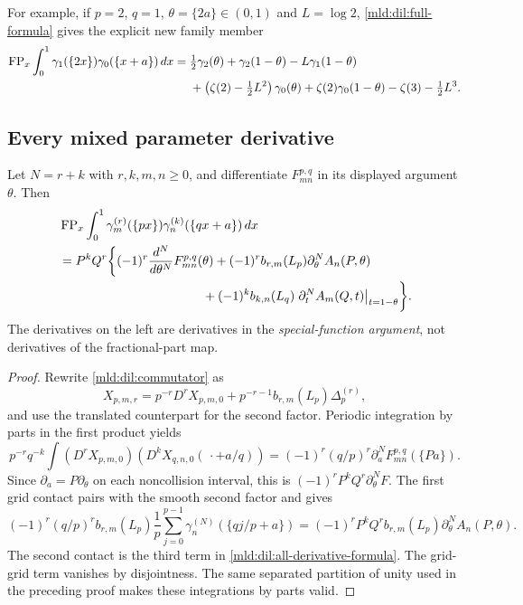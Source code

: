 For example, if $p=2$, $q=1$, $\theta=\{2a\}\in(0,1)$ and
$L=\log2$, \eqref{mld:dil:full-formula} gives the explicit new family member
\begin{align}
 \operatorname{FP}_x\int_0^1\gamma_1(\{2x\})\gamma_0(\{x+a\})\,dx
 ={}&\tfrac12\gamma_2(\theta)+\gamma_2(1-\theta)
        -L\gamma_1(1-\theta)\notag\\
 &+\left(\zeta(2)-\tfrac12L^2\right)\gamma_0(\theta)
        +\zeta(2)\gamma_0(1-\theta)-\zeta(3)-\tfrac12L^3.
 \label{mld:dil:mixed-example}
\end{align}

\subsection{Every mixed parameter derivative}
\begin{theorem}
\label{mld:dil:all-derivatives}
Let $N=r+k$ with $r,k,m,n\ge0$, and differentiate
$F_{mn}^{p,q}$ in its displayed argument $\theta$.  Then
\begin{align}
 &\operatorname{FP}_x\int_0^1
       \gamma_m^{(r)}(\{px\})\gamma_n^{(k)}(\{qx+a\})\,dx\notag\\
 &=P^kQ^r\biggl\{
       (-1)^r\frac{d^N}{d\theta^N}F_{mn}^{p,q}(\theta)
       +(-1)^r b_{r,m}(L_p)\partial_\theta^N A_n(P,\theta)\notag\\
 &\hspace{40mm}
       +(-1)^k b_{k,n}(L_q)
          \left.\partial_t^N A_m(Q,t)\right|_{t=1-\theta}
               \biggr\}.
 \label{mld:dil:all-derivative-formula}
\end{align}
The derivatives on the left are derivatives in the \emph{special-function
argument}, not derivatives of the fractional-part map.
\end{theorem}
\begin{proof}
Rewrite \eqref{mld:dil:commutator} as
\[
 X_{p,m,r}=p^{-r}D^rX_{p,m,0}
          +p^{-r-1}b_{r,m}(L_p)\Delta_p^{(r)},
\]
and use the translated counterpart for the second factor.  Periodic
integration by parts in the first product yields
\[
 p^{-r}q^{-k}\int(D^rX_{p,m,0})(D^kX_{q,n,0}(\,\cdot+a/q))
 =(-1)^r(q/p)^r\partial_a^NF_{mn}^{p,q}(\{Pa\}).
\]
Since $\partial_a=P\partial_\theta$ on each noncollision interval,
this is $(-1)^rP^kQ^r\partial_\theta^NF$.
The first grid contact pairs with the smooth second factor and gives
\[
 (-1)^r(q/p)^r b_{r,m}(L_p)\frac1p
       \sum_{j=0}^{p-1}\gamma_n^{(N)}(\{qj/p+a\})
 =(-1)^rP^kQ^r b_{r,m}(L_p)\partial_\theta^NA_n(P,\theta).
\]
The second contact is the third term in
\eqref{mld:dil:all-derivative-formula}.  The grid-grid term vanishes by
disjointness.  The same separated partition of unity used in the
preceding proof makes these integrations by parts valid.
\end{proof}

